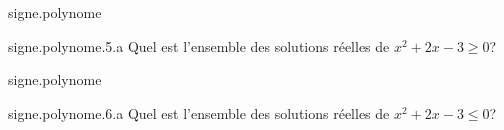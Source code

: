 \begin{qcm}{signe.polynome}
    \begin{question}{signe.polynome.5.a}
         Quel est l'ensemble des solutions réelles de \(x^2+2x-3\geqslant 0\)?
         \vspace{0.1cm}
         \begin{reponses}
            \bonne{\(]-\infty,-3]\cup[1,+\infty[\)}
            \mauvaise{\(]-\infty,-1]\cup[3,+\infty[\)}
            \mauvaise{\([0,1]\)}
            \mauvaise{\([-3,1]\)}
            \mauvaise{\([-1,3]\)}
         \end{reponses}
         \vspace{0.4cm}
    \end{question}
\end{qcm}


\begin{qcm}{signe.polynome}
    \begin{question}{signe.polynome.6.a}
         Quel est l'ensemble des solutions réelles de \(x^2+2x-3\leqslant 0\)?
         \vspace{0.1cm}
         \begin{reponses}
            \mauvaise{\(]-\infty,-3]\cup[1,+\infty[\)}
            \mauvaise{\(]-\infty,-1]\cup[3,+\infty[\)}
            \mauvaise{\([0,1]\)}
            \bonne{\([-3,1]\)}
            \mauvaise{\([-1,3]\)}
         \end{reponses}
         \vspace{0.4cm}
    \end{question}
\end{qcm}